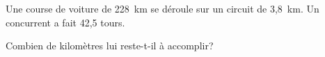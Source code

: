 Une course de voiture de 228~km se déroule sur un circuit de 3,8~km.
Un concurrent a fait 42,5 tours. \par 
Combien de kilomètres lui reste-t-il à accomplir? 